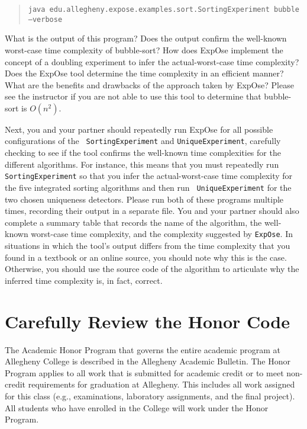 \begin{quote}
{\tt java edu.allegheny.expose.examples.sort.SortingExperiment bubble --verbose}
\end{quote}

\noindent What is the output of this program? Does the output confirm the well-known worst-case time complexity of
bubble-sort? How does {\sc ExpOse} implement the concept of a doubling experiment to infer the actual-worst-case time
complexity? Does the {\sc ExpOse} tool determine the time complexity in an efficient manner? What are the benefits and
drawbacks of the approach taken by {\sc ExpOse}? Please see the instructor if you are not able to use this tool to
determine that bubble-sort is $O(n^2)$.

Next, you and your partner should repeatedly run {\sc ExpOse} for all possible configurations of the {\tt
SortingExperiment} and {\tt UniqueExperiment}, carefully checking to see if the tool confirms the well-known time
complexities for the different algorithms. For instance, this means that you must repeatedly run {\tt SortingExperiment}
so that you infer the actual-worst-case time complexity for the five integrated sorting algorithms and then run {\tt
UniqueExperiment} for the two chosen uniqueness detectors. Please run both of these programs multiple times, recording
their output in a separate file. You and your partner should also complete a summary table that records the name of the
algorithm, the well-known worst-case time complexity, and the complexity suggested by {\tt ExpOse}. In situations in
which the tool's output differs from the time complexity that you found in a textbook or an online source, you should
note why this is the case. Otherwise, you should use the source code of the algorithm to articulate why the inferred
time complexity is, in fact, correct.

\section*{Carefully Review the Honor Code}

The Academic Honor Program that governs the entire academic program at Allegheny College is described in the Allegheny
Academic Bulletin. The Honor Program applies to all work that is submitted for academic credit or to meet non-credit
requirements for graduation at Allegheny. This includes all work assigned for this class (e.g., examinations, laboratory
assignments, and the final project). All students who have enrolled in the College will work under the Honor Program.

